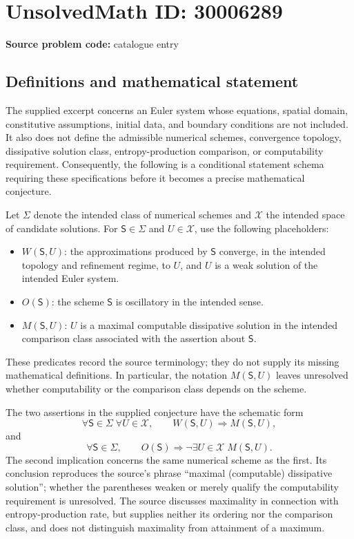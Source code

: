 \documentclass[11pt]{article}
\begin{document}
\section*{UnsolvedMath ID: 30006289}
\textbf{Source problem code:} catalogue entry
\subsection{Definitions and mathematical statement}
The supplied excerpt concerns an Euler system whose equations, spatial domain, constitutive assumptions, initial data, and boundary conditions are not included. It also does not define the admissible numerical schemes, convergence topology, dissipative solution class, entropy-production comparison, or computability requirement. Consequently, the following is a conditional statement schema requiring these specifications before it becomes a precise mathematical conjecture.

Let \(\Sigma\) denote the intended class of numerical schemes and \(\mathcal X\) the intended space of candidate solutions. For \(\mathsf S\in\Sigma\) and \(U\in\mathcal X\), use the following placeholders:
\begin{itemize}
\item \(W(\mathsf S,U)\): the approximations produced by \(\mathsf S\) converge, in the intended topology and refinement regime, to \(U\), and \(U\) is a weak solution of the intended Euler system.
\item \(O(\mathsf S)\): the scheme \(\mathsf S\) is oscillatory in the intended sense.
\item \(M(\mathsf S,U)\): \(U\) is a maximal computable dissipative solution in the intended comparison class associated with the assertion about \(\mathsf S\).
\end{itemize}
These predicates record the source terminology; they do not supply its missing mathematical definitions. In particular, the notation \(M(\mathsf S,U)\) leaves unresolved whether computability or the comparison class depends on the scheme.

The two assertions in the supplied conjecture have the schematic form
\[
\forall\mathsf S\in\Sigma\;\forall U\in\mathcal X,
\qquad W(\mathsf S,U)\Longrightarrow M(\mathsf S,U),
\]
and
\[
\forall\mathsf S\in\Sigma,
\qquad O(\mathsf S)\Longrightarrow
\neg\exists U\in\mathcal X\;M(\mathsf S,U).
\]
The second implication concerns the same numerical scheme as the first. Its conclusion reproduces the source's phrase ``maximal (computable) dissipative solution''; whether the parentheses weaken or merely qualify the computability requirement is unresolved. The source discusses maximality in connection with entropy-production rate, but supplies neither its ordering nor the comparison class, and does not distinguish maximality from attainment of a maximum.
\end{document}

